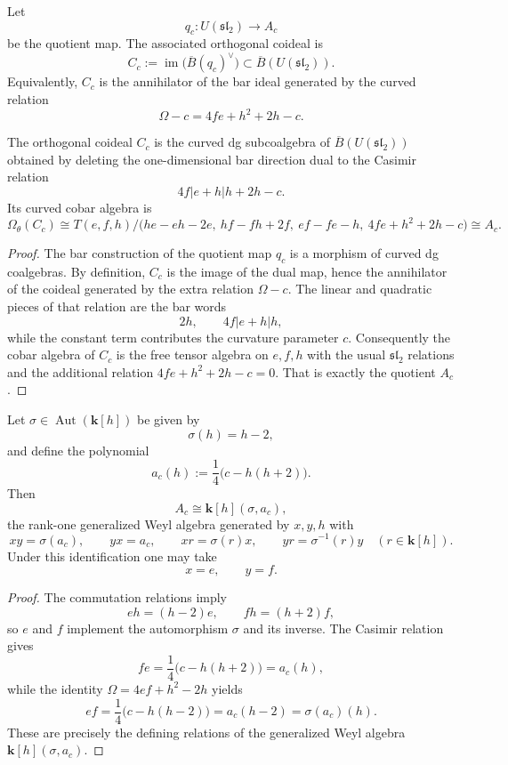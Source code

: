 \begin{definition}
\label{def:rank-one-orthogonal-coideal}
Let
\[
q_c\colon U(\mathfrak{sl}_2)\to A_c
\]
be the quotient map. The associated orthogonal coideal is
\[
C_c:=\operatorname{im}\bigl(\overline{B}(q_c)^\vee\bigr)
\subset \overline{B}(U(\mathfrak{sl}_2)).
\]
Equivalently, $C_c$ is the annihilator of the bar ideal generated by the curved
relation
\[
\Omega-c=4fe+h^2+2h-c.
\]
\end{definition}

\begin{theorem}
\label{thm:explicit-rank-one-orthogonal-coideal}
The orthogonal coideal $C_c$ is the curved dg subcoalgebra of
$\overline{B}(U(\mathfrak{sl}_2))$ obtained by deleting the one-dimensional bar
direction dual to the Casimir relation
\[
4f|e+h|h+2h-c.
\]
Its curved cobar algebra is
\[
\Omega_\theta(C_c)
\cong
T(e,f,h)\Big/\bigl(he-eh-2e,\ hf-fh+2f,\ ef-fe-h,\ 4fe+h^2+2h-c\bigr)
\cong A_c.
\]
\end{theorem}

\begin{proof}
The bar construction of the quotient map $q_c$ is a morphism of curved dg
coalgebras. By definition, $C_c$ is the image of the dual map, hence the
annihilator of the coideal generated by the extra relation $\Omega-c$. The
linear and quadratic pieces of that relation are the bar words
\[
2h,
\qquad
4f|e+h|h,
\]
while the constant term contributes the curvature parameter $c$.
Consequently the cobar algebra of $C_c$ is the free tensor algebra on $e,f,h$
with the usual $\mathfrak{sl}_2$ relations and the additional relation
$4fe+h^2+2h-c=0$. That is exactly the quotient $A_c$.
\end{proof}

\begin{corollary}
\label{cor:generalized-weyl-normal-form}
Let $\sigma\in \operatorname{Aut}(\mathbf{k}[h])$ be given by
\[
\sigma(h)=h-2,
\]
and define the polynomial
\[
a_c(h):=\frac{1}{4}\bigl(c-h(h+2)\bigr).
\]
Then
\[
A_c\cong \mathbf{k}[h](\sigma,a_c),
\]
the rank-one generalized Weyl algebra generated by $x,y,h$ with
\[
xy=\sigma(a_c),
\qquad yx=a_c,
\qquad xr=\sigma(r)x,
\qquad yr=\sigma^{-1}(r)y
\quad (r\in\mathbf{k}[h]).
\]
Under this identification one may take
\[
x=e,
\qquad y=f.
\]
\end{corollary}

\begin{proof}
The commutation relations imply
\[
eh=(h-2)e,
\qquad fh=(h+2)f,
\]
so $e$ and $f$ implement the automorphism $\sigma$ and its inverse. The Casimir
relation gives
\[
fe=\frac{1}{4}\bigl(c-h(h+2)\bigr)=a_c(h),
\]
while the identity $\Omega=4ef+h^2-2h$ yields
\[
ef=\frac{1}{4}\bigl(c-h(h-2)\bigr)=a_c(h-2)=\sigma(a_c)(h).
\]
These are precisely the defining relations of the generalized Weyl algebra
$\mathbf{k}[h](\sigma,a_c)$.
\end{proof}

